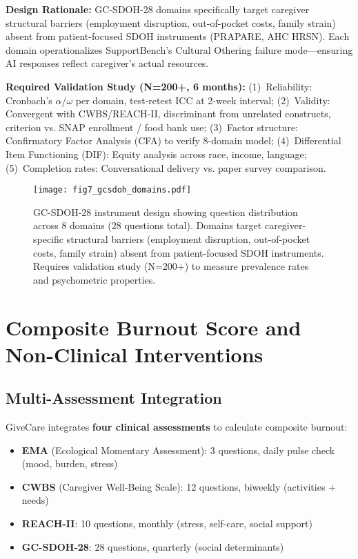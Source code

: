 \documentclass{article}
\begin{document}
\textbf{Design Rationale:} GC-SDOH-28 domains specifically target caregiver structural barriers (employment disruption, out-of-pocket costs, family strain) absent from patient-focused SDOH instruments (PRAPARE, AHC HRSN). Each domain operationalizes SupportBench's Cultural Othering failure mode—ensuring AI responses reflect caregiver's actual resources.

\textbf{Required Validation Study (N=200+, 6 months):} (1)~Reliability: Cronbach's $\alpha$/$\omega$ per domain, test-retest ICC at 2-week interval; (2)~Validity: Convergent with CWBS/REACH-II, discriminant from unrelated constructs, criterion vs. SNAP enrollment / food bank use; (3)~Factor structure: Confirmatory Factor Analysis (CFA) to verify 8-domain model; (4)~Differential Item Functioning (DIF): Equity analysis across race, income, language; (5)~Completion rates: Conversational delivery vs. paper survey comparison.

%
\begin{figure}[htbp]%
\centering%
\texttt{[image: fig7\_gcsdoh\_domains.pdf]}%
\caption{GC{-}SDOH{-}28 instrument design showing question distribution across 8 domains (28 questions total). Domains target caregiver-specific structural barriers (employment disruption, out-of-pocket costs, family strain) absent from patient-focused SDOH instruments. Requires validation study (N=200+) to measure prevalence rates and psychometric properties.}%
\label{fig:gcsdoh}%
\end{figure}%
\section{Composite Burnout Score and Non{-}Clinical Interventions}%
\label{sec:CompositeBurnoutScoreandNon{-}ClinicalInterventions}%
%
\subsection{Multi{-}Assessment Integration}%
\label{subsec:Multi{-}AssessmentIntegration}%
GiveCare integrates \textbf{four clinical assessments} to calculate composite burnout:

\begin{itemize}
    \item \textbf{EMA} (Ecological Momentary Assessment): 3 questions, daily pulse check (mood, burden, stress)
    \item \textbf{CWBS} (Caregiver Well-Being Scale): 12 questions, biweekly (activities + needs)~\cite{tebb1995,tebb2013}
    \item \textbf{REACH-II}: 10 questions, monthly (stress, self-care, social support)~\cite{bella2006}
    \item \textbf{GC-SDOH-28}: 28 questions, quarterly (social determinants)
\end{itemize}
\end{document}
